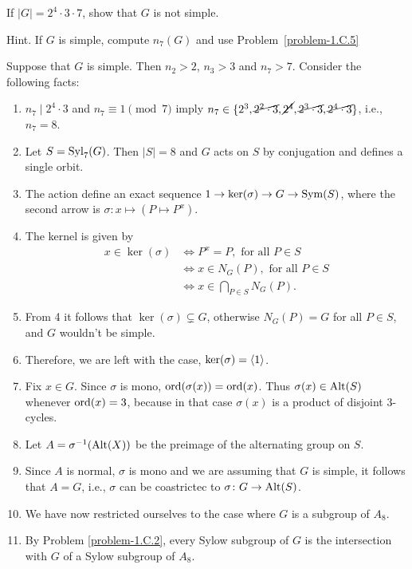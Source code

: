 \begin{probl}
    If\/ $|G|=2^4\cdot3\cdot7$, show that\/ $G$ is not simple.

    \textrm{\rm Hint. If $G$ is simple, compute $n_7(G)$ and use Problem~\ref{problem-1.C.5}}
\end{probl}

\begin{solution} Suppose that $G$ is simple. Then $n_2>2$, $n_3>3$ and $n_7>7$. Consider the following facts:
\begin{enumerate}[\rm1.]
    \item $n_7\mid2^4\cdot3$ and $n_7\equiv1\pmod7$ imply $n_7\in\{2^3, \cancel{2^2\cdot3}, \cancel{2^4}, \cancel{2^3\cdot3}, \cancel{2^4\cdot3}\}$, i.e., $n_7=8$.
    \item Let $S={\rm Syl}_7(G)$. Then $|S|=8$ and $G$ acts on $S$ by conjugation and defines a single orbit.
    \item The action define an exact sequence $1\to\ker(\sigma)\to G\to{\rm Sym}(S)$, where the second arrow is $\sigma\colon x\mapsto(P\mapsto P^x)$.
    \item The kernel is given by
    \begin{align*}
        x\in\ker(\sigma) &\iff P^x=P, \text{ for all }P\in S\\
            &\iff x\in N_G(P), \text{ for all }P\in S\\
            &\iff x\in\bigcap_{P\in S}N_G(P).
    \end{align*}
    \item From 4 it follows that $\ker(\sigma)\varsubsetneq G$, otherwise $N_G(P)=G$ for all $P\in S$, and $G$ wouldn't be simple.
    \item Therefore, we are left with the case, $\ker(\sigma)=\langle1\rangle$.
    \item Fix $x\in G$. Since $\sigma$ is mono, ${\rm ord}(\sigma(x))={\rm ord}(x)$. Thus $\sigma(x)\in {\rm Alt}(S)$ whenever ${\rm ord}(x)=3$, because in that case $\sigma(x)$ is a product of disjoint $3$-cycles.
    \item Let $A=\sigma^{-1}({\rm Alt}(X))$ be the preimage of the alternating group on $S$.
    \item Since $A$ is normal, $\sigma$ is mono and we are assuming that $G$ is simple, it follows that $A=G$, i.e., $\sigma$ can be coastrictec to $\sigma\colon G\to{\rm Alt}(S)$.
    \item We have now restricted ourselves to the case where $G$ is a subgroup of $A_8$.
    \item By Problem \ref{problem-1.C.2}, every Sylow subgroup of $G$ is the intersection with $G$ of a Sylow subgroup of $A_8$.

\end{enumerate}
\end{solution}

